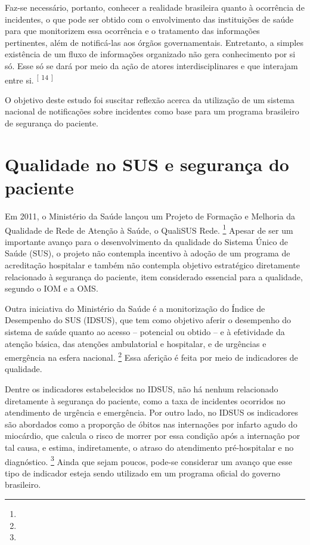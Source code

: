 \documentclass{article}
\begin{document}

Faz-se necessário, portanto, conhecer a realidade brasileira quanto à ocorrência de
        incidentes, o que pode ser obtido com o envolvimento das instituições de saúde para que
        monitorizem essa ocorrência e o tratamento das informações pertinentes, além de notificá-las
        aos órgãos governamentais. Entretanto, a simples existência de um fluxo de informações
        organizado não gera conhecimento por si só. Esse só se dará por meio da ação de atores
        interdisciplinares e que interajam entre si. %
\textsuperscript{[}%
\textsuperscript{14}
\textsuperscript{]}  


O objetivo deste estudo foi suscitar reflexão acerca da utilização de um sistema nacional
        de notificações sobre incidentes como base para um programa brasileiro de segurança do
        paciente.

\section{%
Qualidade no SUS e segurança do paciente}

Em 2011, o Ministério da Saúde lançou um Projeto de Formação e Melhoria da Qualidade de
        Rede de Atenção à Saúde, o QualiSUS Rede. %
\footnote{}  
 Apesar de ser um importante avanço para o desenvolvimento da qualidade do Sistema
        Único de Saúde (SUS), o projeto não contempla incentivo à adoção de um programa de
        acreditação hospitalar e também não contempla objetivo estratégico diretamente relacionado à
        segurança do paciente, item considerado essencial para a qualidade, segundo o IOM e a
        OMS.

Outra iniciativa do Ministério da Saúde é a monitorização do Índice de Desempenho do SUS
        (IDSUS), que tem como objetivo aferir o desempenho do sistema de saúde quanto ao acesso –
        potencial ou obtido – e à efetividade da atenção básica, das atenções ambulatorial e
        hospitalar, e de urgências e emergência na esfera nacional. %
\footnote{}  
 Essa aferição é feita por meio de indicadores de qualidade.

Dentre os indicadores estabelecidos no IDSUS, não há nenhum relacionado diretamente à
        segurança do paciente, como a taxa de incidentes ocorridos no atendimento de urgência e
        emergência. Por outro lado, no IDSUS os indicadores são abordados como a proporção de óbitos
        nas internações por infarto agudo do miocárdio, que calcula o risco de morrer por essa
        condição após a internação por tal causa, e estima, indiretamente, o atraso do atendimento
        pré-hospitalar e no diagnóstico. %
\footnote{}  
 Ainda que sejam poucos, pode-se considerar um avanço que esse tipo de indicador
        esteja sendo utilizado em um programa oficial do governo brasileiro.
\end{document}
